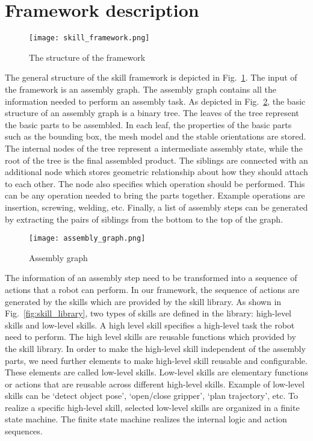 \section{Framework description}
\begin{figure}[!htbp]
\centering
\texttt{[image: skill\_framework.png]}
\captionsetup{justification=raggedright}
\caption{The structure of the framework}
\label{fig:assembly_skill_framework}       %
\end{figure} 
The general structure of the skill framework is depicted in Fig.~\ref{fig:assembly_skill_framework}. 
The input of the framework is an assembly graph. The assembly graph contains all the information needed to perform an assembly task. As depicted in Fig.~\ref{fig:assembly_graph}, the basic structure of an assembly graph is a binary tree. The leaves of the tree represent the basic parts to be assembled. In each leaf, the properties of the basic parts such as the bounding box, the mesh model and the stable orientations are stored. The internal nodes of the tree represent a intermediate assembly state, while the root of the tree is the final assembled product. The siblings are connected with an additional node which stores geometric relationship about how they should attach to each other. The node also specifies which operation should be performed. This can be any operation needed to bring the parts together. Example operations are insertion, screwing, welding, etc. Finally, a list of assembly steps can be generated by extracting the pairs of siblings from the bottom to the top of the graph. 

\begin{figure}[!htbp]
\centering
\texttt{[image: assembly\_graph.png]}
\captionsetup{justification=raggedright}
\caption{Assembly graph}
\label{fig:assembly_graph}       %
\end{figure} 
The information of an assembly step need to be transformed into a sequence of actions that a robot can perform. In our framework, the sequence of actions are generated by the skills which are provided by the skill library. As shown in Fig.~\ref{fig:skill_library}, two types of skills are defined in the library: high-level skills and low-level skills. A high level skill specifies a high-level task the robot need to perform. The high level skills are reusable functions which provided by the skill library. In order to make the high-level skill independent of the assembly parts, we need further elements to make high-level skill reusable and configurable. These elements are called low-level skills. Low-level skills are elementary functions or actions that are reusable across different high-level skills.  Example of low-level skills can be `detect object pose', `open/close gripper', `plan trajectory', etc. To realize a specific high-level skill, selected low-level skills are organized in a finite state machine. The finite state machine realizes the internal logic and action sequences. 

